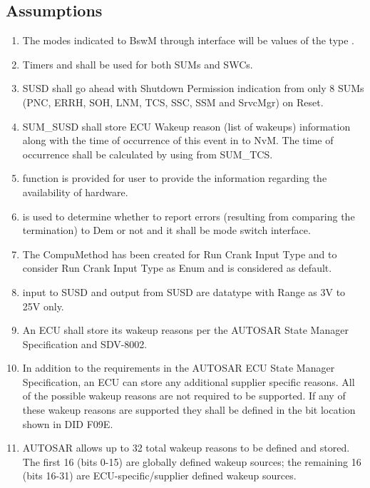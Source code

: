 \subsection{Assumptions}
\label{sec:assumptions}
{}
{     }
\begin{enumerate}
\item The modes indicated to BswM through  interface will be values of the type .
\item Timers  and  shall be used for both SUMs and SWCs.
\item SUSD shall go ahead with Shutdown Permission indication from only 8 SUMs (PNC, ERRH, SOH, LNM, TCS, SSC, SSM and SrvcMgr) on Reset.
\item SUM_SUSD shall store ECU Wakeup reason (list of wakeups) information along with the time of occurrence of this event in to NvM.
The time of occurrence shall be calculated by using  from SUM_TCS.
\item {} function is provided for user to provide the information regarding the availability of hardware.
\item {} is used to determine whether to report errors (resulting from comparing the termination) to Dem or not and it shall be mode switch interface.
\item The CompuMethod has been created for Run Crank Input Type  and  to consider Run Crank Input Type as Enum and  is considered as default.
\item {} input to SUSD and  output from SUSD are   datatype with Range as 3V to 25V only.
\item An ECU shall store its wakeup reasons per the AUTOSAR State Manager Specification and SDV-8002.
\item In addition to the requirements in the AUTOSAR ECU State Manager Specification, an ECU can store any additional supplier specific reasons. All of the possible wakeup reasons are not required to be supported. If any of these wakeup reasons are supported they shall be defined in the bit location shown in DID F09E.
\item AUTOSAR allows up to 32 total wakeup reasons to be defined and stored. The first 16 (bits 0-15) are globally defined wakeup sources; the remaining 16 (bits 16-31) are ECU-specific/supplier defined wakeup sources.

\end{enumerate}
